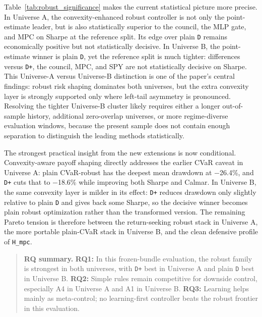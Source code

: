 \documentclass[10pt,twocolumn]{article}
\begin{document}
Table~\ref{tab:robust_significance} makes the current statistical picture more
precise. In Universe A, the convexity-enhanced robust controller is not only
the point-estimate leader, but is also statistically superior to the council,
the MLP gate, and MPC on Sharpe at the reference split. Its edge over plain
\texttt{D} remains economically positive but not statistically decisive. In
Universe B, the point-estimate winner is plain \texttt{D}, yet the reference
split is much tighter: differences versus \texttt{D+}, the council, MPC, and
SPY are not statistically decisive on Sharpe. This Universe-A versus
Universe-B distinction is one of the paper's central findings: robust risk
shaping dominates both universes, but the extra convexity layer is strongly
supported only where left-tail asymmetry is pronounced. Resolving the tighter
Universe-B cluster likely requires either a longer out-of-sample history,
additional zero-overlap universes, or more regime-diverse evaluation windows,
because the present sample does not contain enough separation to distinguish
the leading methods statistically.

The strongest practical insight from the new extensions is now conditional.
Convexity-aware payoff shaping directly addresses the earlier CVaR caveat in
Universe A: plain CVaR-robust has the deepest mean drawdown at $-$26.4\%, and
\texttt{D+} cuts that to $-$18.6\% while improving both Sharpe and Calmar. In
Universe B, the same convexity layer is milder in its effect: \texttt{D+}
reduces drawdown only slightly relative to plain \texttt{D} and gives back some
Sharpe, so the decisive winner becomes plain robust optimization rather than
the transformed version. The remaining Pareto tension is therefore between the
return-seeking robust stack in Universe A, the more portable plain-CVaR stack
in Universe B, and the clean defensive profile of \texttt{H\_mpc}.

\begin{quote}\small\noindent\textbf{RQ summary.} \textbf{RQ1:} In this frozen-bundle evaluation, the robust family is strongest in both universes, with \texttt{D+} best in Universe A and plain \texttt{D} best in Universe B. \textbf{RQ2:} Simple rules remain competitive for downside control, especially A4 in Universe A and A1 in Universe B. \textbf{RQ3:} Learning helps mainly as meta-control; no learning-first controller beats the robust frontier in this evaluation.\end{quote}
\end{document}
